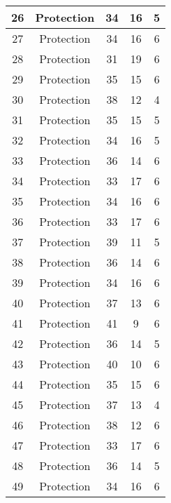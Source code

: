 \documentclass[results.tex]{subfiles}
\begin{document}
\begin{center}
\begin{tabular}{| c || c | c | c | c |}
    \hline
    26 & Protection & 34 & 16 & 5 \\ 
    \hline
    27 & Protection & 34 & 16 & 6 \\ 
    \hline
    28 & Protection & 31 & 19 & 6 \\ 
    \hline
    29 & Protection & 35 & 15 & 6 \\ 
    \hline
    30 & Protection & 38 & 12 & 4 \\ 
    \hline
    31 & Protection & 35 & 15 & 5 \\ 
    \hline
    32 & Protection & 34 & 16 & 5 \\ 
    \hline
    33 & Protection & 36 & 14 & 6 \\ 
    \hline
    34 & Protection & 33 & 17 & 6 \\ 
    \hline
    35 & Protection & 34 & 16 & 6 \\ 
    \hline
    36 & Protection & 33 & 17 & 6 \\ 
    \hline
    37 & Protection & 39 & 11 & 5 \\ 
    \hline
    38 & Protection & 36 & 14 & 6 \\ 
    \hline
    39 & Protection & 34 & 16 & 6 \\ 
    \hline
    40 & Protection & 37 & 13 & 6 \\ 
    \hline
    41 & Protection & 41 & 9 & 6 \\ 
    \hline
    42 & Protection & 36 & 14 & 5 \\ 
    \hline
    43 & Protection & 40 & 10 & 6 \\ 
    \hline
    44 & Protection & 35 & 15 & 6 \\ 
    \hline
    45 & Protection & 37 & 13 & 4 \\ 
    \hline
    46 & Protection & 38 & 12 & 6 \\ 
    \hline
    47 & Protection & 33 & 17 & 6 \\ 
    \hline
    48 & Protection & 36 & 14 & 5 \\ 
    \hline
    49 & Protection & 34 & 16 & 6 \\ 
    \hline   \end{tabular}
\end{center}
\end{document}
